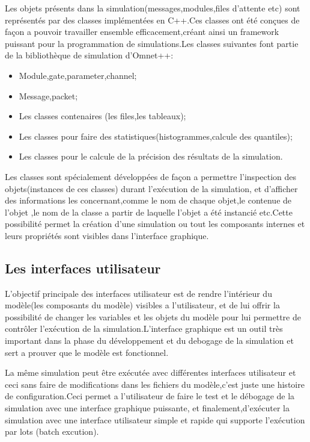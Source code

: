 Les objets présents dans la simulation(messages,modules,files d'attente etc) sont représentés par des classes implémentées en C++.Ces classes ont été conçues de façon a pouvoir travailler ensemble efficacement,créant ainsi  un framework puissant pour la programmation de simulations.Les classes suivantes font partie de la bibliothèque de simulation d'Omnet++:

\begin{itemize}

\item Module,gate,parameter,channel;
\item Message,packet;
\item Les classes contenaires (les files,les tableaux);
\item Les classes pour faire des statistiques(histogrammes,calcule des quantiles);
\item Les classes pour le calcule de la précision des résultats de la simulation.
\end{itemize} 

Les classes sont spécialement développées de façon a permettre l'inspection des objets(instances de ces classes) durant l'exécution de la simulation, et d'afficher des informations les concernant,comme le nom de chaque objet,le contenue de l'objet ,le nom de la classe a partir de laquelle l'objet a été instancié etc.Cette possibilité permet la création d'une simulation ou tout les composants internes et leurs propriétés sont visibles dans l'interface graphique.

\subsection{Les interfaces utilisateur}
L'objectif principale des interfaces utilisateur est de rendre l'intérieur du modèle(les composants du modèle) visibles a l'utilisateur, et de lui offrir la possibilité de changer les variables et les objets du modèle pour lui permettre de contrôler l'exécution de la simulation.L'interface graphique est un outil très important dans la phase du développement et du debogage de la simulation et sert a prouver que le modèle est fonctionnel.

La même simulation peut être exécutée avec différentes interfaces utilisateur et ceci  sans faire de modifications dans les fichiers du modèle,c'est juste une histoire de configuration.Ceci  permet  a l'utilisateur de faire le test et le débogage de la simulation avec  une interface graphique puissante, et finalement,d'exécuter la simulation avec une interface  utilisateur simple et rapide qui supporte l'exécution  par lots (batch excution).

